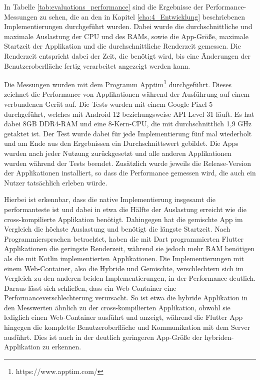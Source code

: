 In Tabelle \ref{tab:evaluations_performance} sind die Ergebnisse der Performance-Messungen zu sehen, die an den in Kapitel \ref{cha:4_Entwicklung} beschriebenen Implementierungen durchgeführt wurden. Dabei wurde die durchschnittliche und maximale Auslastung der CPU und des RAMs, sowie die App-Größe, maximale Startzeit der Applikation und die durchschnittliche Renderzeit gemessen. 
Die Renderzeit entspricht dabei der Zeit, die benötigt wird, bis eine Änderungen der Benutzeroberfläche fertig verarbeitet angezeigt werden kann.

Die Messungen wurden mit dem Programm Apptim\footnote{https://www.apptim.com/} durchgeführt. Dieses zeichnet die Performance von Applikationen während der Ausführung auf einem verbundenen Gerät auf. Die Tests wurden mit einem Google Pixel 5 durchgeführt, welches mit Android 12 beziehungsweise API Level 31 läuft. Es hat dabei 8GB DDR4-RAM und eine 8-Kern-CPU, die mit durchschnittlich 1,9 GHz getaktet ist.
Der Test wurde dabei für jede Implementierung fünf mal wiederholt und am Ende aus den Ergebnissen ein Durchschnittswert gebildet.
Die Apps wurden nach jeder Nutzung zurückgesetzt und alle anderen Applikationen wurden während der Tests beendet.
Zusätzlich wurde jeweils die Release-Version der Applikationen installiert, so dass die Performance gemessen wird, die auch ein Nutzer tatsächlich erleben würde.

Hierbei ist erkennbar, dass die native Implementierung insgesamt die performanteste ist und dabei in etwa die Hälfte der Auslastung erreicht wie die cross-kompilierte Applikation benötigt.
Dahingegen hat die gemischte App im Vergleich die höchste Auslastung und benötigt die längste Startzeit.
Nach Programmiersprachen betrachtet, haben die mit Dart programmierten Flutter Applikationen die geringste Renderzeit, während sie jedoch mehr RAM benötigen als die mit Kotlin implementierten Applikationen.
Die Implementierungen mit einem Web-Container, also die Hybride und Gemischte, verschlechtern sich im Vergleich zu den anderen beiden Implementierungen, in der Performance deutlich. Daraus lässt sich schließen, dass ein Web-Container eine  Performanceverschlechterung verursacht. So ist etwa die hybride Applikation in den Messwerten ähnlich zu der cross-kompilierten Applikation, obwohl sie lediglich einen Web-Container ausführt und anzeigt, während die Flutter App hingegen die komplette Benutzeroberfläche und Kommunikation mit dem Server ausführt. Dies ist auch in der deutlich geringeren App-Größe der hybriden-Applikation zu erkennen.  

